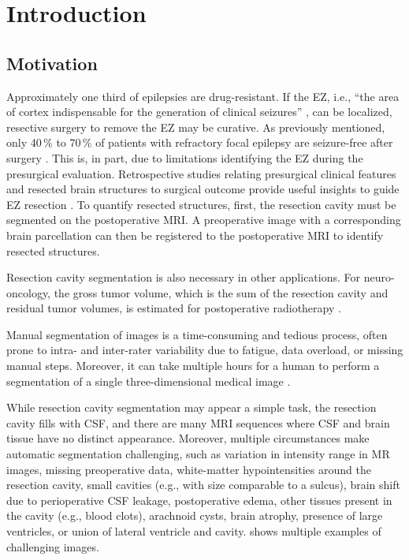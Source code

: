 \section{Introduction}

\subsection{Motivation}

Approximately one third of epilepsies are drug-resistant.
If the \ac{EZ}, i.e., ``the area of cortex indispensable for the generation of clinical seizures'' \cite{rosenow_presurgical_2001}, can be localized, resective surgery to remove the \ac{EZ} may be curative.
As previously mentioned, only 40\,\% to 70\,\% of patients with refractory focal epilepsy are seizure-free after surgery \cite{jobst_resective_2015}.
This is, in part, due to limitations identifying the \ac{EZ} during the presurgical evaluation.
Retrospective studies relating presurgical clinical features and resected brain structures to surgical outcome provide useful insights to guide \ac{EZ} resection \cite{jobst_resective_2015}.
To quantify resected structures, first, the resection cavity must be segmented on the postoperative \ac{MRI}.
A preoperative image with a corresponding brain parcellation can then be registered to the postoperative \ac{MRI} to identify resected structures.

Resection cavity segmentation is also necessary in other applications.
For neuro-oncology, the gross tumor volume, which is the sum of the resection cavity and residual tumor volumes, is estimated for postoperative radiotherapy \cite{ermis_fully_2020}.

Manual segmentation of images is a time-consuming and tedious process, often prone to intra- and inter-rater variability due to fatigue, data overload, or missing manual steps.
Moreover, it can take multiple hours for a human to perform a segmentation of a single three-dimensional medical image \cite{sharma_automated_2010}.

While resection cavity segmentation may appear a simple task, the resection cavity fills with \ac{CSF}, and there are many \ac{MRI} sequences where \ac{CSF} and brain tissue have no distinct appearance.
Moreover, multiple circumstances make automatic segmentation challenging, such as
variation in intensity range in MR images,
missing preoperative data,
white-matter hypointensities around the resection cavity,
small cavities (e.g., with size comparable to a sulcus),
brain shift due to perioperative \ac{CSF} leakage,
postoperative edema,
other tissues present in the cavity (e.g., blood clots),
arachnoid cysts,
brain atrophy,
presence of large ventricles, or
union of lateral ventricle and cavity.
 shows multiple examples of challenging images.

